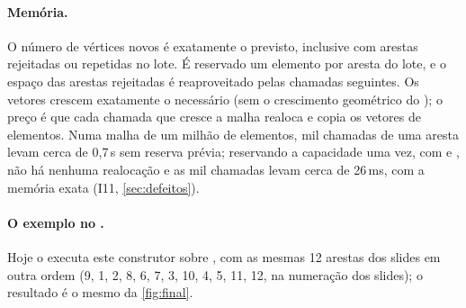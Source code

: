 \paragraph{Memória.} O número de vértices novos é exatamente o previsto, inclusive com arestas rejeitadas ou repetidas
no lote. É reservado um elemento por aresta do lote, e o espaço das arestas rejeitadas é reaproveitado pelas chamadas
seguintes. Os vetores crescem exatamente o necessário (sem o crescimento geométrico do ); o preço é que
cada chamada que cresce a malha realoca e copia os vetores de elementos. Numa malha de um milhão de elementos, mil
chamadas de uma aresta levam cerca de 0,7\,s sem reserva prévia; reservando a capacidade uma vez, com
 e , não há nenhuma realocação e as mil chamadas levam cerca
de 26\,ms, com a memória exata (I11, \cref{sec:defeitos}).

\paragraph{O exemplo no .} Hoje o  executa este construtor sobre ,
com as mesmas 12 arestas dos slides em outra ordem (9, 1, 2, 8, 6, 7, 3, 10, 4, 5, 11, 12, na numeração dos slides); o
resultado é o mesmo da \cref{fig:final}.
